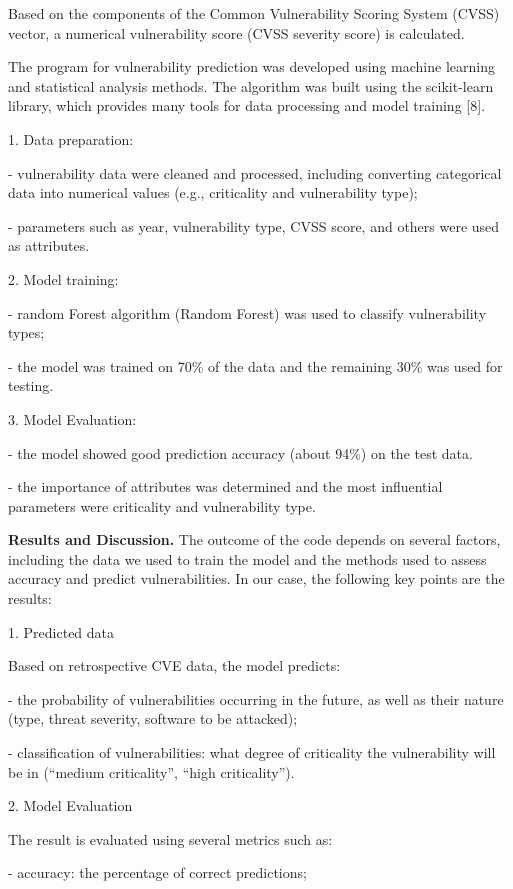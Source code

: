 \begin{multicols}{2}
Based on the components of the Common Vulnerability Scoring System
(CVSS) vector, a numerical vulnerability score (CVSS severity score) is
calculated.

The program for vulnerability prediction was developed using machine
learning and statistical analysis methods. The algorithm was built using
the scikit-learn library, which provides many tools for data processing
and model training {[}8{]}.

1. Data preparation:

- vulnerability data were cleaned and processed, including converting
categorical data into numerical values (e.g., criticality and
vulnerability type);

- parameters such as year, vulnerability type, CVSS score, and others
were used as attributes.

2. Model training:

- random Forest algorithm (Random Forest) was used to classify
vulnerability types;

- the model was trained on 70\% of the data and the remaining 30\% was
used for testing.

3. Model Evaluation:

- the model showed good prediction accuracy (about 94\%) on the test
data.

- the importance of attributes was determined and the most influential
parameters were criticality and vulnerability type.

{\bfseries Results and Discussion.} The outcome of the code depends on
several factors, including the data we used to train the model and the
methods used to assess accuracy and predict vulnerabilities. In our
case, the following key points are the results:

1. Predicted data

Based on retrospective CVE data, the model predicts:

- the probability of vulnerabilities occurring in the future, as well as
their nature (type, threat severity, software to be attacked);

- classification of vulnerabilities: what degree of criticality the
vulnerability will be in (``medium criticality'', ``high criticality'').

2. Model Evaluation

The result is evaluated using several metrics such as:

- accuracy: the percentage of correct predictions;


\end{multicols}

